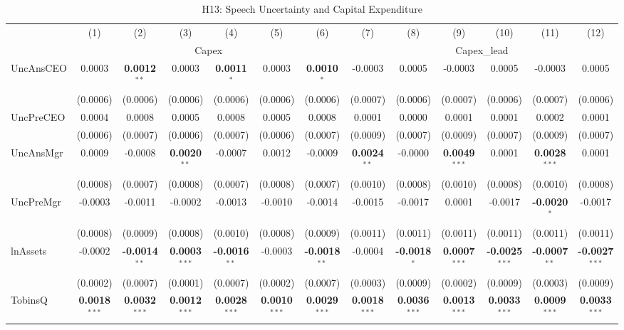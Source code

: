 \documentclass[11pt,a4paper]{article}
\begin{document}
\begin{table}[htbp]
\centering
\caption{H13: Speech Uncertainty and Capital Expenditure}
\label{tab:h13}
\scriptsize
\begin{tabular}{lcccccccccccc}
\toprule
 & (1) & (2) & (3) & (4) & (5) & (6) & (7) & (8) & (9) & (10) & (11) & (12) \\
 & \multicolumn{6}{c}{Capex} & \multicolumn{6}{c}{Capex\_lead} \\
\cmidrule(lr){2-7} \cmidrule(lr){8-13}
\midrule
UncAnsCEO & 0.0003 & \textbf{0.0012}$^{**}$ & 0.0003 & \textbf{0.0011}$^{*}$ & 0.0003 & \textbf{0.0010}$^{*}$ & -0.0003 & 0.0005 & -0.0003 & 0.0005 & -0.0003 & 0.0005 \\
 & (0.0006) & (0.0006) & (0.0006) & (0.0006) & (0.0006) & (0.0006) & (0.0007) & (0.0006) & (0.0007) & (0.0006) & (0.0007) & (0.0006) \\
UncPreCEO & 0.0004 & 0.0008 & 0.0005 & 0.0008 & 0.0005 & 0.0008 & 0.0001 & 0.0000 & 0.0001 & 0.0001 & 0.0002 & 0.0001 \\
 & (0.0006) & (0.0007) & (0.0006) & (0.0007) & (0.0006) & (0.0007) & (0.0009) & (0.0007) & (0.0009) & (0.0007) & (0.0009) & (0.0007) \\
UncAnsMgr & 0.0009 & -0.0008 & \textbf{0.0020}$^{**}$ & -0.0007 & 0.0012 & -0.0009 & \textbf{0.0024}$^{**}$ & -0.0000 & \textbf{0.0049}$^{***}$ & 0.0001 & \textbf{0.0028}$^{***}$ & 0.0001 \\
 & (0.0008) & (0.0007) & (0.0008) & (0.0007) & (0.0008) & (0.0007) & (0.0010) & (0.0008) & (0.0010) & (0.0008) & (0.0010) & (0.0008) \\
UncPreMgr & -0.0003 & -0.0011 & -0.0002 & -0.0013 & -0.0010 & -0.0014 & -0.0015 & -0.0017 & 0.0001 & -0.0017 & \textbf{-0.0020}$^{*}$ & -0.0017 \\
 & (0.0008) & (0.0009) & (0.0008) & (0.0010) & (0.0008) & (0.0009) & (0.0011) & (0.0011) & (0.0011) & (0.0011) & (0.0011) & (0.0011) \\
\midrule
lnAssets & -0.0002 & \textbf{-0.0014}$^{**}$ & \textbf{0.0003}$^{***}$ & \textbf{-0.0016}$^{**}$ & -0.0003 & \textbf{-0.0018}$^{**}$ & -0.0004 & \textbf{-0.0018}$^{*}$ & \textbf{0.0007}$^{***}$ & \textbf{-0.0025}$^{***}$ & \textbf{-0.0007}$^{**}$ & \textbf{-0.0027}$^{***}$ \\
 & (0.0002) & (0.0007) & (0.0001) & (0.0007) & (0.0002) & (0.0007) & (0.0003) & (0.0009) & (0.0002) & (0.0009) & (0.0003) & (0.0009) \\
TobinsQ & \textbf{0.0018}$^{***}$ & \textbf{0.0032}$^{***}$ & \textbf{0.0012}$^{***}$ & \textbf{0.0028}$^{***}$ & \textbf{0.0010}$^{***}$ & \textbf{0.0029}$^{***}$ & \textbf{0.0018}$^{***}$ & \textbf{0.0036}$^{***}$ & \textbf{0.0013}$^{***}$ & \textbf{0.0033}$^{***}$ & \textbf{0.0009}$^{***}$ & \textbf{0.0033}$^{***}$ \\

\end{tabular}
\end{table}
\end{document}
